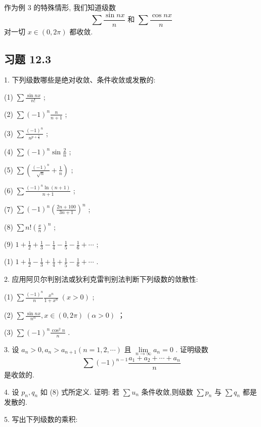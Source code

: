 作为例 3 的特殊情形, 我们知道级数
\[
\sum \frac{\sin {nx}}{n}\text{ 和 }\sum \frac{\cos {nx}}{n}
\]
对一切 \(x \in  \left( {0,{2\pi }}\right)\) 都收敛.

\subsection{习题 12.3}

1. 下列级数哪些是绝对收敛、条件收敛或发散的:

(1) \(\sum \frac{\sin {nx}}{n!}\) ;

(2) \(\sum {\left( -1\right) }^{n}\frac{n}{n + 1}\) ;

(3) \(\sum \frac{{\left( -1\right) }^{n}}{{n}^{p + \frac{1}{n}}}\) ;

(4) \(\sum {\left( -1\right) }^{n}\sin \frac{2}{n}\) ;

(5) \(\sum \left( {\frac{{\left( -1\right) }^{n}}{\sqrt{n}} + \frac{1}{n}}\right)\) ;

(6) \(\sum \frac{{\left( -1\right) }^{n}\ln \left( {n + 1}\right) }{n + 1}\) ;

(7) \(\sum {\left( -1\right) }^{n}{\left( \frac{{2n} + {100}}{{3n} + 1}\right) }^{n}\) ;

(8) \(\sum n!{\left( \frac{x}{n}\right) }^{n}\) ;

(9) \(1 + \frac{1}{2} + \frac{1}{3} - \frac{1}{4} - \frac{1}{5} - \frac{1}{6} + \cdots\) ;

(1) \(1 + \frac{1}{2} - \frac{1}{3} + \frac{1}{4} + \frac{1}{5} - \frac{1}{6} + \cdots\) .

2. 应用阿贝尔判别法或狄利克雷判别法判断下列级数的敛散性:

(1) \(\sum \frac{{\left( -1\right) }^{n}}{n}\frac{{x}^{n}}{1 + {x}^{n}}\;\left( {x > 0}\right)\) ;

(2) \(\sum \frac{\sin {nx}}{{n}^{\alpha }},x \in  \left( {0,{2\pi }}\right) \;\left( {\alpha  > 0}\right)\) ；

(3) \(\sum {\left( -1\right) }^{n}\frac{{\cos }^{2}n}{n}\) .

3. 设 \({a}_{n} > 0,{a}_{n} > {a}_{n + 1}\left( {n = 1,2,\cdots }\right)\) 且 \(\mathop{\lim }\limits_{{n \rightarrow  \infty }}{a}_{n} = 0\) . 证明级数
\[
\sum {\left( -1\right) }^{n - 1}\frac{{a}_{1} + {a}_{2} + \cdots  + {a}_{n}}{n}
\]
是收敛的.

4. 设 \({p}_{n},{q}_{n}\) 如 (8) 式所定义. 证明: 若 \(\sum {u}_{n}\) 条件收敛,则级数 \(\sum {p}_{n}\) 与 \(\sum {q}_{n}\) 都是发散的.

5. 写出下列级数的乘积:

